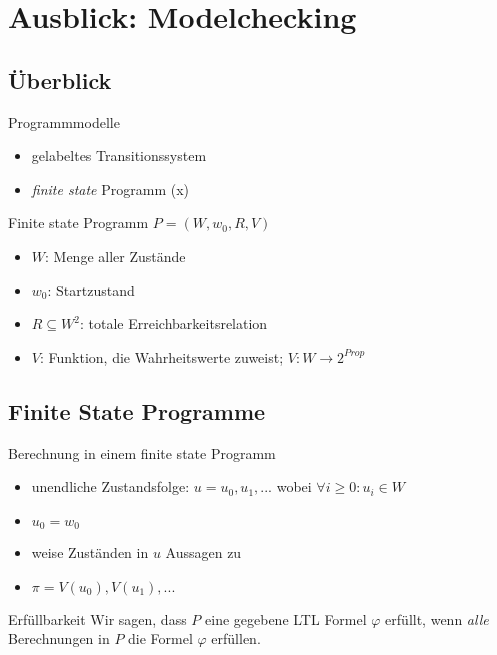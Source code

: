 \section{Ausblick: Modelchecking}

\subsection{Überblick}
\begin{frame}{\insertsubsection}
    \begin{block}{Programmmodelle}
        \begin{itemize}
            \item gelabeltes Transitionssystem
            \item \textit{finite state} Programm (x)
        \end{itemize}
    \end{block}
    \begin{block}{Finite state Programm}
    $P = (W, w_0, R, V)$
        \begin{itemize}
            \item $W$: Menge aller Zustände
            \item $w_0$: Startzustand
            \item $R \subseteq W^2$: totale Erreichbarkeitsrelation
            \item $V$: Funktion, die Wahrheitswerte zuweist; $V: W \rightarrow 2^{Prop}$
        \end{itemize}
    \end{block}
\end{frame}

\subsection{Finite State Programme}
\begin{frame}{\insertsubsection}
    \begin{block}{Berechnung in einem finite state Programm \cite{vardi+96}}
    \begin{itemize}
        \item unendliche Zustandsfolge: $u = u_0, u_1, ... $ wobei $\forall i \geq 0: u_i \in W$
        \item $u_0 = w_0$
        \item weise Zuständen in $u$ Aussagen zu
        \item $\pi = V(u_0), V(u_1), ...$
    \end{itemize}
    \end{block}
    \begin{block}{Erfüllbarkeit}
        Wir sagen, dass $P$ eine gegebene LTL Formel $\varphi$ erfüllt, wenn \textit{alle} Berechnungen in $P$ die Formel $\varphi$ erfüllen.
    \end{block}
\end{frame}

